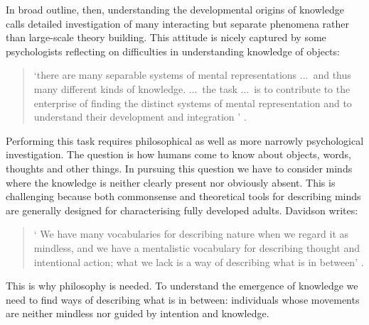 \documentclass[12pt,\papersize]{extarticle}
\begin{document}
In broad outline, then, understanding the developmental origins of knowledge calls detailed investigation of many interacting but separate phenomena rather than large-scale theory building. 
This attitude is nicely captured by some psychologists reflecting on difficulties in understanding knowledge of objects:
%
\begin{quote}
`there are many separable systems of mental representations ...\ and thus many different kinds of knowledge. ...\ the task ...\ is to contribute to the enterprise of finding the distinct systems of mental representation and to understand their development and integration%
'
\citep[p.\ 1522]{Hood:2000bf}.
\end{quote}
%
Performing this task  requires philosophical as well as more narrowly psychological investigation. 
The question is how humans come to know about objects, words, thoughts and other things. 
In pursuing this question we have to consider minds where the knowledge is neither clearly present nor obviously absent. 
This is challenging because both commonsense and theoretical tools for describing minds are generally designed for characterising fully developed adults. 
Davidson writes:
%
\begin{quote}
`%
We have many vocabularies for describing nature when we regard it as mindless, and we have a mentalistic vocabulary for describing thought and intentional action; what we lack is a way of describing what is in between' \citep[p.\ 11]{Davidson:1999ju}.
\end{quote}
%
%
This is why philosophy is needed. 
To understand the emergence of knowledge we need to find ways of describing what is in between: individuals whose movements are neither mindless nor guided by intention and knowledge.  
\end{document}
